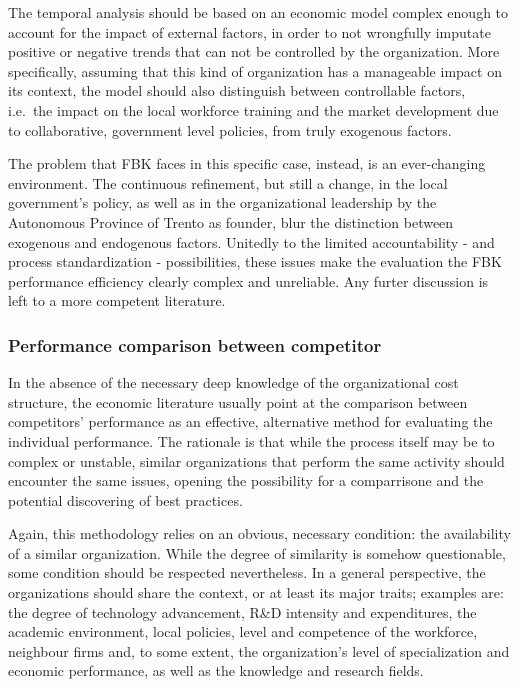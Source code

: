 The temporal analysis should be based on an economic model complex enough to account for the impact of external factors, in order to not wrongfully imputate positive or negative trends that can not be controlled by the organization. More specifically, assuming that this kind of organization has a manageable impact on its context, the model should also distinguish between controllable factors, i.e.\ the impact on the local workforce training and the market development due to collaborative, government level policies, from truly exogenous factors.

The problem that FBK faces in this specific case, instead, is an ever-changing environment. The continuous refinement, but still a change, in the local government's policy, as well as in the organizational leadership by the Autonomous Province of Trento as founder, blur the distinction between exogenous and endogenous factors. Unitedly to the limited accountability - and process standardization - possibilities, these issues make the evaluation the FBK performance efficiency clearly complex and unreliable. Any furter discussion is left to a more competent literature.

\subsubsection{Performance comparison between competitor}

In the absence of the necessary deep knowledge of the organizational cost structure, the economic literature usually point at the comparison between competitors' performance as an effective, alternative method for evaluating the individual performance. The rationale is that while the process itself may be to complex or unstable, similar organizations that perform the same activity should encounter the same issues, opening the possibility for a comparrisone and the potential discovering of best practices.

Again, this methodology relies on an obvious, necessary condition: the availability of a similar organization. While the degree of similarity is somehow questionable, some condition should be respected nevertheless. In a general perspective, the organizations should share the context, or at least its major traits; examples are: the degree of technology advancement, R\&D intensity and expenditures, the academic environment, local policies, level and competence of the workforce, neighbour firms and, to some extent, the organization's level of specialization and economic performance, as well as the knowledge and research fields.

